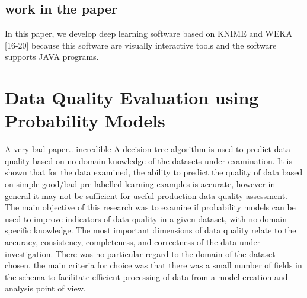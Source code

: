 \documentclass{article}
\begin{document}
\subsection{work in the paper}
In this paper, we develop deep learning
software based on KNIME and WEKA [16-20]
because this software are visually interactive
tools and the software supports JAVA programs.
\section{Data Quality Evaluation using Probability Models}
A very bad paper.. incredible
A decision tree algorithm is used to predict data quality based
on no domain knowledge of the datasets under examination. It is shown that for the data examined, the ability
to predict the quality of data based on simple good/bad pre-labelled learning examples is accurate, however
in general it may not be sufficient for useful production data quality assessment.
The main objective of this research was to examine if
probability models can be used to improve indicators
of data quality in a given dataset, with no domain
specific knowledge.
The most important dimensions of data
quality relate to the accuracy, consistency, completeness, and correctness of the data under investigation.
There was no particular regard to the
domain of the dataset chosen, the main criteria for
choice was that there was a small number of fields in
the schema to facilitate efficient processing of data
from a model creation and analysis point of view.
\end{document}
